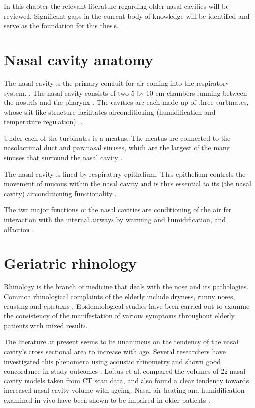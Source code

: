 In this chapter the relevant literature regarding older nasal cavities will be reviewed. Significant gaps in the current body of knowledge will be identified and serve as the foundation for this thesis.

\section{Nasal cavity anatomy}

The nasal cavity is the primary conduit for air coming into the respiratory system. \cite{Elad2008}. The nasal cavity consists of two 5 by 10 cm chambers running between the nostrils and the pharynx \cite{Mygind1998}. The cavities are each made up of three turbinates, whose slit-like structure facilitates airconditioning (humidification and temperature regulation). \cite{Mygind1998}. 

Under each of the turbinates is a meatus. The meatus are connected to the nasolacrimal duct and paranasal sinuses, which are the largest of the many sinuses that surround the nasal cavity \cite{Mygind1998}. 

The nasal cavity is lined by respiratory epithelium. This epithelium controls the movement of mucous within the nasal cavity and is thus essential to its (the nasal cavity) airconditioning functionality \cite{Mygind1998}.

The two major functions of the nasal cavities are conditioning of the air for interaction with the internal airways by warming and humidification, and olfaction \cite{Doorly2008, Elad2008, Mygind1998, Berglund1982}.

\section{Geriatric rhinology}
Rhinology is the branch of medicine that deals with the nose and its pathologies. 
Common rhinological complaints of the elderly include dryness, runny noses, crusting and epistaxis \cite{Varga-Huettner2013}. Epidemiological studies have been carried out to examine the consistency of the manifestation of various symptoms throughout elderly patients with mixed results. 

The literature at present seems to be unanimous on the tendency of the nasal cavity's cross sectional area to increase with age. Several researchers have investigated this phenomena using acoustic rhinometry and shown good concordance in study outcomes \cite{Kalmovich2005, Edelstein1996,WhanKim2007,Lindemann2008}. Loftus et al. \cite{Loftus2016} compared the volumes of 22 nasal cavity models taken from CT scan data, and also found a clear tendency towards increased nasal cavity volume with ageing. Nasal air heating and humidification examined in vivo have been shown to be impaired in older patients \cite{Lindemann2008}. 


